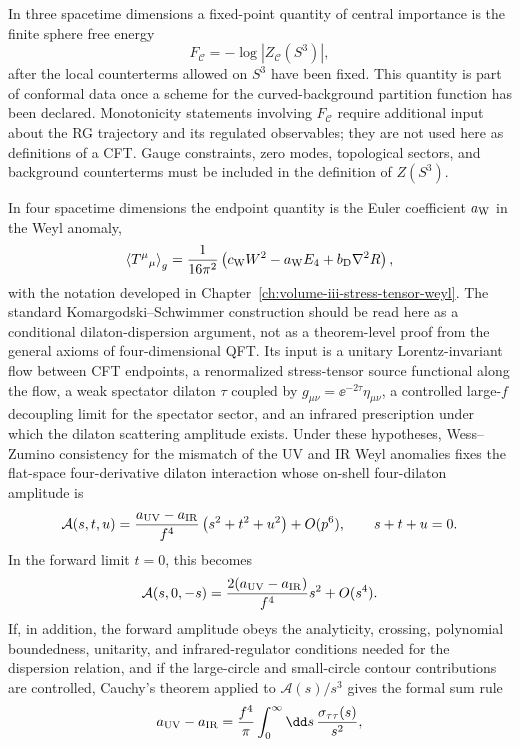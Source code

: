 In three spacetime dimensions a fixed-point quantity of central importance is
the finite sphere free energy
\[
  F_{\mathcal C}
  =
  -\log |Z_{\mathcal C}(S^3)| ,
\]
after the local counterterms allowed on \(S^3\) have been fixed.  This
quantity is part of conformal data once a scheme for the curved-background
partition function has been declared.  Monotonicity statements involving
\(F_{\mathcal C}\) require additional input about the RG trajectory and its
regulated observables; they are not used here as definitions of a CFT.  Gauge
constraints, zero modes, topological sectors, and background counterterms must
be included in the definition of \(Z(S^3)\).

In four spacetime dimensions the endpoint quantity is the Euler coefficient
\(a_{\rm W}\) in the Weyl anomaly,
\[
  \left\langle T^\mu{}_\mu\right\rangle_g
  =
  \frac{1}{16\pi^2}
  \left(
    c_{\rm W}W^2-a_{\rm W}E_4+b_{\rm D}\nabla^2R
  \right),
\]
with the notation developed in
Chapter~\ref{ch:volume-iii-stress-tensor-weyl}.  The standard
Komargodski--Schwimmer construction should be read here as a conditional
dilaton-dispersion argument, not as a theorem-level proof from the general
axioms of four-dimensional QFT.  Its input is a unitary Lorentz-invariant
flow between CFT endpoints, a renormalized stress-tensor source functional
along the flow, a weak spectator dilaton \(\tau\) coupled by
\(g_{\mu\nu}=\ee^{-2\tau}\eta_{\mu\nu}\), a controlled large-\(f\) decoupling
limit for the spectator sector, and an infrared prescription under which the
dilaton scattering amplitude exists.  Under these hypotheses,
Wess--Zumino consistency for the mismatch of the UV and IR Weyl anomalies
fixes the flat-space four-derivative dilaton interaction whose on-shell
four-dilaton amplitude is
\begin{equation}
  \mathcal A(s,t,u)
  =
  \frac{a_{\rm UV}-a_{\rm IR}}{f^4}
  \left(s^2+t^2+u^2\right)
  +O(p^6),
  \qquad
  s+t+u=0 .
  \label{eq:ks-four-dilaton-amplitude}
\end{equation}
In the forward limit \(t=0\), this becomes
\[
  \mathcal A(s,0,-s)
  =
  \frac{2(a_{\rm UV}-a_{\rm IR})}{f^4}s^2+O(s^4).
\]
If, in addition, the forward amplitude obeys the analyticity, crossing,
polynomial boundedness, unitarity, and infrared-regulator conditions needed
for the dispersion relation, and if the large-circle and small-circle
contour contributions are controlled, Cauchy's theorem applied to
\(\mathcal A(s)/s^3\) gives the formal sum rule
\begin{equation}
  a_{\rm UV}-a_{\rm IR}
  =
  \frac{f^4}{\pi}
  \int_0^\infty\dd s\,
  \frac{\sigma_{\tau\tau}(s)}{s^2},
  \label{eq:ks-a-theorem-sum-rule}
\end{equation}
